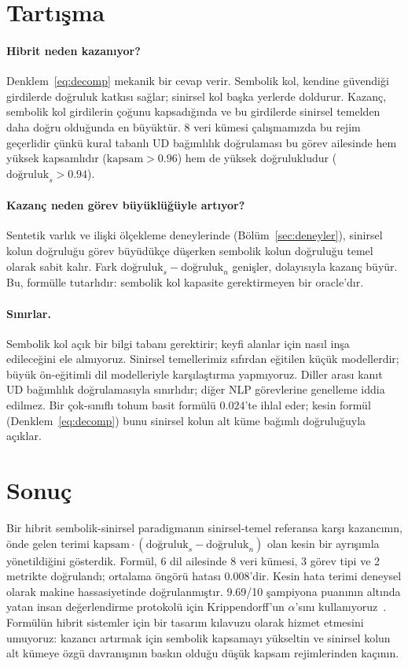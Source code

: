 \documentclass[11pt,a4paper]{article}
\begin{document}
\section{Tartışma}
\label{sec:tartisma}

\paragraph{Hibrit neden kazanıyor?}
Denklem~\ref{eq:decomp} mekanik bir cevap verir. Sembolik kol, kendine
güvendiği girdilerde doğruluk katkısı sağlar; sinirsel kol başka
yerlerde doldurur. Kazanç, sembolik kol girdilerin çoğunu kapsadığında
ve bu girdilerde sinirsel temelden daha doğru olduğunda en büyüktür.
8 veri kümesi çalışmamızda bu rejim geçerlidir çünkü kural tabanlı UD
bağımlılık doğrulaması bu görev ailesinde hem yüksek kapsamlıdır
($\text{kapsam} > 0.96$) hem de yüksek doğrulukludur
($\text{doğruluk}_s > 0.94$).

\paragraph{Kazanç neden görev büyüklüğüyle artıyor?}
Sentetik varlık ve ilişki ölçekleme deneylerinde
(Bölüm~\ref{sec:deneyler}), sinirsel kolun doğruluğu görev büyüdükçe
düşerken sembolik kolun doğruluğu temel olarak sabit kalır. Fark
$\text{doğruluk}_s - \text{doğruluk}_n$ genişler, dolayısıyla kazanç
büyür. Bu, formülle tutarlıdır: sembolik kol kapasite gerektirmeyen
bir oracle'dır.

\paragraph{Sınırlar.}
Sembolik kol açık bir bilgi tabanı gerektirir; keyfi alanlar için nasıl
inşa edileceğini ele almıyoruz. Sinirsel temellerimiz sıfırdan
eğitilen küçük modellerdir; büyük ön-eğitimli dil modelleriyle
karşılaştırma yapmıyoruz. Diller arası kanıt UD bağımlılık
doğrulamasıyla sınırlıdır; diğer NLP görevlerine genelleme iddia
edilmez. Bir çok-sınıflı tohum basit formülü $0.024$'te ihlal eder;
kesin formül (Denklem~\ref{eq:decomp}) bunu sinirsel kolun alt küme
bağımlı doğruluğuyla açıklar.

\section{Sonuç}
\label{sec:sonuc}
Bir hibrit sembolik-sinirsel paradigmanın sinirsel-temel referansa
karşı kazancının, önde gelen terimi
$\text{kapsam} \cdot (\text{doğruluk}_s - \text{doğruluk}_n)$ olan
kesin bir ayrışımla yönetildiğini gösterdik. Formül, 6 dil ailesinde 8
veri kümesi, 3 görev tipi ve 2 metrikte doğrulandı; ortalama öngörü
hatası $0.008$'dir. Kesin hata terimi deneysel olarak makine
hassasiyetinde doğrulanmıştır. 9.69/10 şampiyona puanının altında
yatan insan değerlendirme protokolü için Krippendorff'un $\alpha$'sını
kullanıyoruz~\cite{krippendorff2011computing}. Formülün hibrit
sistemler için bir tasarım kılavuzu olarak hizmet etmesini umuyoruz:
kazancı artırmak için sembolik kapsamayı yükseltin ve sinirsel kolun
alt kümeye özgü davranışının baskın olduğu düşük kapsam
rejimlerinden kaçının.



\end{document}
